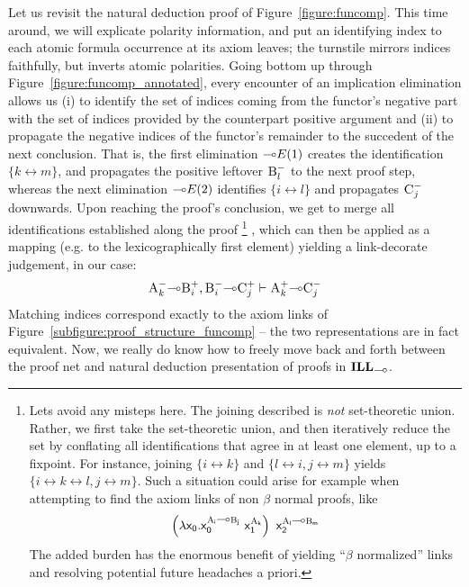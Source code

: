 Let us revisit the natural deduction proof of Figure~\ref{figure:funcomp}.
This time around, we will explicate polarity information, and put an identifying index to each atomic formula occurrence at its axiom leaves; 
the turnstile mirrors indices faithfully, but inverts atomic polarities.
Going bottom up through Figure~\ref{figure:funcomp_annotated}, every encounter of an implication elimination allows us (i) to identify the set of indices coming from the functor's negative part with the set of indices provided by the counterpart positive argument and (ii) to propagate the negative indices of the functor's remainder to the succedent of the next conclusion.
That is, the first elimination $\li E(1)$ creates the identification $\{k \leftrightarrow m\}$, and propagates the positive leftover $\nprop{B}_l$ to the next proof step, whereas the next elimination $\li E(2)$ identifies $\{i \leftrightarrow l\}$ and propagates $\nprop{C}_j$ downwards.
Upon reaching the proof's conclusion, we get to merge all identifications established along the proof%
\footnote{
Lets avoid any misteps here. The joining described is \textit{not} set-theoretic union. Rather, we first take the set-theoretic union, and then iteratively reduce the set by conflating all identifications that agree in at least one element, up to a fixpoint.
For instance, joining $\{ i \leftrightarrow k\}$ and $\{ l\leftrightarrow i, j \leftrightarrow m\}$ yields $\{i \leftrightarrow k \leftrightarrow l, j \leftrightarrow m \}$. Such a situation could arise for example when attempting to find the axiom links of non $\beta$ normal proofs, like
\[
\term{\left(\lambda x_0.x_0^{\prop{A}_i \li \prop{B}_j}~x_1^{\prop{A}_k}\right)~x_2^{\prop{A}_l \li \prop{B}_m}}
\]
The added burden has the enormous benefit of yielding ``$\beta$ normalized'' links and resolving potential future headaches a priori.
}
, which can then be applied as a mapping (e.g. to the lexicographically first element) yielding a link-decorate judgement, in our case:
\[
	\nprop{A}_k \li \pprop{B}_i, \nprop{B}_i \li \pprop{C}_j \vdash \pprop{A}_k \li \nprop{C}_j
\]
Matching indices correspond exactly to the axiom links of Figure~\ref{subfigure:proof_structure_funcomp} -- the two representations are in fact equivalent.
Now, we really do know how to freely move back and forth between the proof net and natural deduction presentation of proofs in $\ILL_{\li}$.

